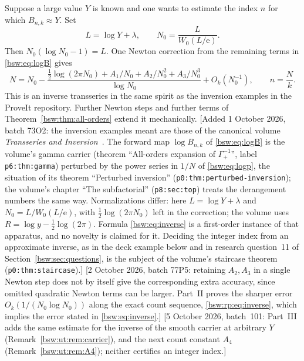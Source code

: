\documentclass[11pt,letterpaper]{article}
\theoremstyle{definition}
\theoremstyle{remark}
\newcommand{\ee}{\mathrm e}
\begin{document}
Suppose a large value $Y$ is known and one wants to estimate the index $n$
for which $B_{n,k}\approx Y$.  Set
\begin{equation}\label{bsw:eq:Linv}
 L=\log Y+\lambda,
 \qquad
 N_0=\frac{L}{W_0(L/\ee)}.
\end{equation}
Then $N_0(\log N_0-1)=L$.  One Newton correction from the remaining terms in
\eqref{bsw:eq:logB} gives
\begin{equation}\label{bsw:eq:inverse}
 \boxed{\displaystyle
 N=N_0-
 \frac{\tfrac12\log(2\pi N_0)+A_1/N_0+A_2/N_0^2+A_3/N_0^3}
      {\log N_0}
 +O_k(N_0^{-1}),
 \qquad n=\frac Nk.}
\end{equation}
This is an inverse transseries in the same spirit as the inversion examples in
the ProveIt repository.  Further Newton steps and further terms of
Theorem~\ref{bsw:thm:all-orders} extend it mechanically.
[Added 1 October 2026, batch 73O2: the inversion examples meant are those of
the canonical volume \emph{Transseries and Inversion}~\cite{tai}.  The forward
map $\log B_{n,k}$ of \eqref{bsw:eq:logB} is the volume's gamma carrier
(theorem ``All-orders expansion of $\Gamma_+^{-1}$'', label
\texttt{p6:thm:gamma}) perturbed by the power series in $1/N$ of
\eqref{bsw:eq:logp}, the situation of its theorem ``Perturbed inversion''
(\texttt{p0:thm:perturbed-inversion}); the volume's chapter ``The
subfactorial'' (\texttt{p8:sec:top}) treats the derangement numbers the same
way.  Normalizations differ: here $L=\log Y+\lambda$ and $N_0=L/W_0(L/\ee)$,
with $\tfrac12\log(2\pi N_0)$ left in the correction; the volume uses
$R=\log y-\tfrac12\log(2\pi)$.  Formula \eqref{bsw:eq:inverse} is a
first-order instance of that apparatus, and no novelty is claimed for it.
Deciding the integer index from an approximate inverse, as in the deck
example below and in research question~11 of
Section~\ref{bsw:sec:questions}, is the subject of the volume's staircase
theorem (\texttt{p0:thm:staircase}).]
[2 October 2026, batch 77P5: retaining $A_2,A_3$ in a single Newton step
does not by itself give the corresponding extra accuracy, since omitted
quadratic Newton terms can be larger.  Part~II proves the sharper error
$O_k(1/(N_0\log N_0))$ along the exact count sequence,
\eqref{bsw:rp:eq:inverse}, which implies the error stated in
\eqref{bsw:eq:inverse}.]
[5 October 2026, batch~101: Part~III adds the same estimate for the
inverse of the smooth carrier at arbitrary $Y$
(Remark~\ref{bsw:ut:rem:carrier}), and the next count constant
$A_4$ (Remark~\ref{bsw:ut:rem:A4}); neither certifies an integer index.]
\end{document}
